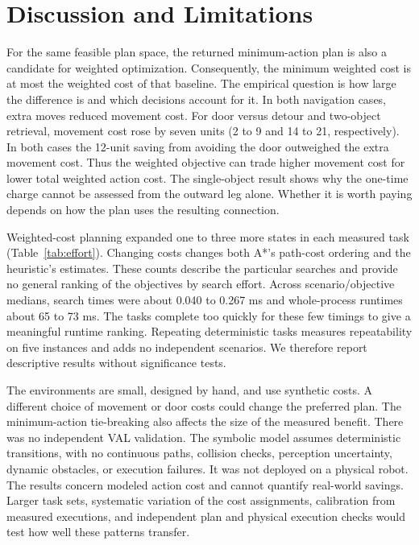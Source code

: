 \documentclass[conference,a4paper]{IEEEtran}
\theoremstyle{plain}
\theoremstyle{definition}
\theoremstyle{remark}
\begin{document}
\section{Discussion and Limitations}
For the same feasible plan space, the returned minimum-action plan is also a candidate for weighted optimization. Consequently, the minimum weighted cost is at most the weighted cost of that baseline. The empirical question is how large the difference is and which decisions account for it. In both navigation cases, extra moves reduced movement cost. For door versus detour and two-object retrieval, movement cost rose by seven units (2 to 9 and 14 to 21, respectively). In both cases the 12-unit saving from avoiding the door outweighed the extra movement cost. Thus the weighted objective can trade higher movement cost for lower total weighted action cost. The single-object result shows why the one-time charge cannot be assessed from the outward leg alone. Whether it is worth paying depends on how the plan uses the resulting connection.

Weighted-cost planning expanded one to three more states in each measured task (Table~\ref{tab:effort}). Changing costs changes both A*'s path-cost ordering and the heuristic's estimates. These counts describe the particular searches and provide no general ranking of the objectives by search effort. Across scenario/objective medians, search times were about 0.040 to 0.267 ms and whole-process runtimes about 65 to 73 ms. The tasks complete too quickly for these few timings to give a meaningful runtime ranking. Repeating deterministic tasks measures repeatability on five instances and adds no independent scenarios. We therefore report descriptive results without significance tests.

The environments are small, designed by hand, and use synthetic costs. A different choice of movement or door costs could change the preferred plan. The minimum-action tie-breaking also affects the size of the measured benefit. There was no independent VAL validation. The symbolic model assumes deterministic transitions, with no continuous paths, collision checks, perception uncertainty, dynamic obstacles, or execution failures. It was not deployed on a physical robot. The results concern modeled action cost and cannot quantify real-world savings. Larger task sets, systematic variation of the cost assignments, calibration from measured executions, and independent plan and physical execution checks would test how well these patterns transfer.
\end{document}

